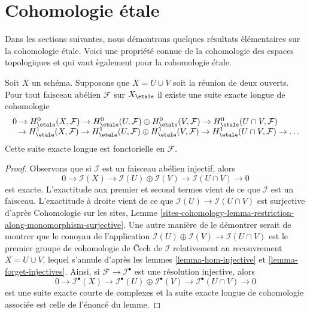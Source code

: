 \section{Cohomologie \'etale}
\label{section-etale-cohomology}

\noindent
Dans les sections suivantes, nous d\'emontrons quelques r\'esultats \`el\'ementaires sur la cohomologie \'etale.
Voici une propri\'et\'e connue de la cohomologie des espaces
topologiques et qui vaut \`egalement pour la cohomologie \'etale.

\begin{lemma}
\label{lemma-mayer-vietoris}
Soit $X$ un sch\'ema. Supposons que $X = U \cup V$ soit la
r\'eunion de deux ouverts. Pour tout faisceau ab\'elien $\mathcal{F}$ sur $X_\etale$
il existe une suite exacte longue de cohomologie
$$
\begin{matrix}
0 \to
H^0_\etale(X, \mathcal{F}) \to
H^0_\etale(U, \mathcal{F}) \oplus H^0_\etale(V, \mathcal{F}) \to
H^0_\etale(U \cap V, \mathcal{F}) \phantom{\to \ldots} \\
\phantom{0} \to H^1_\etale(X, \mathcal{F}) \to
H^1_\etale(U, \mathcal{F}) \oplus H^1_\etale(V, \mathcal{F}) \to
H^1_\etale(U \cap V, \mathcal{F}) \to \ldots
\end{matrix}
$$
Cette suite exacte longue est fonctorielle en $\mathcal{F}$.
\end{lemma}

\begin{proof}
Observons que si $\mathcal{I}$ est un faisceau ab\'elien injectif, alors
$$
0 \to \mathcal{I}(X) \to \mathcal{I}(U) \oplus \mathcal{I}(V) \to
\mathcal{I}(U \cap V) \to 0
$$
est exacte. L'exactitude aux premier et second termes vient de ce que $\mathcal{I}$
est un faisceau. L'exactitude \`a droite vient de ce que
$\mathcal{I}(U) \to \mathcal{I}(U \cap V)$ est surjective d'apr\`es
Cohomologie sur les sites, Lemme
\ref{sites-cohomology-lemma-restriction-along-monomorphism-surjective}.
Une autre mani\`ere de le d\'emontrer serait de montrer que le conoyau
de l'application $\mathcal{I}(U) \oplus \mathcal{I}(V) \to
\mathcal{I}(U \cap V)$ est le premier groupe de cohomologie de {\v C}ech
de $\mathcal{I}$ relativement au recouvrement
$X = U \cup V$, lequel s'annule d'apr\`es les
lemmes \ref{lemma-hom-injective} et \ref{lemma-forget-injectives}.
Ainsi, si $\mathcal{F} \to \mathcal{I}^\bullet$ est une
r\'esolution injective, alors
$$
0 \to \mathcal{I}^\bullet(X) \to
\mathcal{I}^\bullet(U) \oplus \mathcal{I}^\bullet(V) \to
\mathcal{I}^\bullet(U \cap V) \to 0
$$
est une suite exacte courte de complexes et la suite exacte longue
de cohomologie associ\'ee est celle de l'\'enonc\'e du lemme.
\end{proof}

